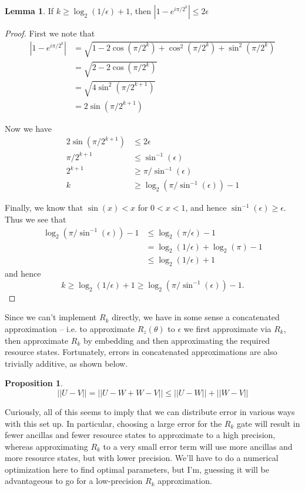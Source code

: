 \documentclass{article}
\theoremstyle{definition}
\theoremstyle{theorem}
\newtheorem{lemma}{Lemma}
\newtheorem{proposition}{Proposition}
\theoremstyle{remark}
\begin{document}
\begin{lemma}
	If $k \geq \log_2(1/\epsilon) + 1$, then $|1 - e^{i\pi/2^k}| \leq 2\epsilon$
\end{lemma}
\begin{proof}
	First we note that
	\begin{align*}
		|1 - e^{i\pi/2^k}| &= \sqrt{1 - 2\cos(\pi/2^k) + \cos^2(\pi/2^k) + \sin^2(\pi/2^k)} \\
			&=\sqrt{2 - 2\cos(\pi/2^k)} \\
			&=\sqrt{4\sin^2(\pi/2^{k+1})} \\
			&=2\sin(\pi/2^{k+1})
	\end{align*}

	Now we have 
	\begin{align*}
		2\sin(\pi/2^{k+1}) &\leq 2\epsilon \\
		\pi/2^{k+1} &\leq \sin^{-1}(\epsilon) \\
		2^{k+1} &\geq \pi/\sin^{-1}(\epsilon) \\
		k &\geq \log_2(\pi/\sin^{-1}(\epsilon)) - 1
	\end{align*}

	Finally, we know that $\sin(x) < x$ for $ 0 < x < 1$, and hence $\sin^{-1}(\epsilon) \geq \epsilon$. Thus we see that
	\begin{align*}
		\log_2(\pi/\sin^{-1}(\epsilon)) - 1 &\leq \log_2(\pi/\epsilon) - 1 \\
			&= \log_2(1/\epsilon) + \log_2(\pi) - 1 \\
			&\leq \log_2(1/\epsilon) + 1
	\end{align*}
	and hence 
	\[k \geq \log_2(1/\epsilon) + 1 \geq \log_2(\pi/\sin^{-1}(\epsilon)) - 1.\]

\end{proof}

Since we can't implement $R_k$ directly, we have in some sense a concatenated approximation -- i.e. to approximate $R_z(\theta)$ to $\epsilon$ we first approximate via $R_k$, then approximate $R_k$ by embedding and then approximating the required resource states. Fortunately, errors in concatenated approximations are also trivially additive, as shown below.
\begin{proposition}
	\[
		||U - V|| = ||U - W + W - V|| \leq || U - W|| + ||W - V||
	\]
\end{proposition}

Curiously, all of this seems to imply that we can distribute error in various ways with this set up. In particular, choosing a large error for the $R_k$ gate will result in fewer ancillas and fewer resource states to approximate to a high precision, whereas approximating $R_k$ to a very small error term will use more ancillas and more resource states, but with lower precision. We'll have to do a numerical optimization here to find optimal parameters, but I'm, guessing it will be advantageous to go for a low-precision $R_k$ approximation.
\end{document}
